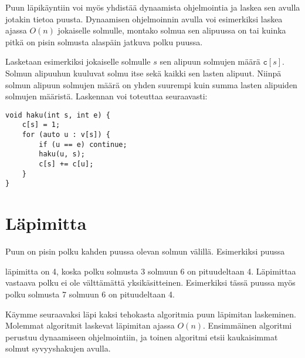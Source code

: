 Puun läpikäyntiin voi myös yhdistää dynaamista
ohjelmointia ja laskea sen avulla jotakin tietoa puusta.
Dynaamisen ohjelmoinnin avulla voi esimerkiksi
laskea ajassa $O(n)$ jokaiselle solmulle,
montako solmua sen alipuussa
on tai kuinka pitkä on pisin solmusta
alaspäin jatkuva polku puussa.

Lasketaan esimerkiksi jokaiselle solmulle $s$
sen alipuun solmujen määrä $\texttt{c}[s]$.
Solmun alipuuhun kuuluvat solmu itse
sekä kaikki sen lasten alipuut.
Niinpä solmun alipuun solmujen määrä on
yhden suurempi kuin summa lasten
alipuiden solmujen määristä.
Laskennan voi toteuttaa seuraavasti:

\begin{lstlisting}
void haku(int s, int e) {
    c[s] = 1;
    for (auto u : v[s]) {
        if (u == e) continue;
        haku(u, s);
        c[s] += c[u];
    }
}
\end{lstlisting}

\section{Läpimitta}


Puun  on pisin polku
kahden puussa olevan solmun välillä.
Esimerkiksi puussa
\begin{center}
\end{center}
läpimitta on 4, koska polku solmusta 3 solmuun 6
on pituudeltaan 4.
Läpimittaa vastaava polku ei ole
välttämättä yksikäsitteinen.
Esimerkiksi tässä puussa myös polku solmusta 7
solmuun 6 on pituudeltaan 4.

Käymme seuraavaksi läpi kaksi tehokasta
algoritmia puun läpimitan laskeminen.
Molemmat algoritmit laskevat läpimitan ajassa
$O(n)$.
Ensimmäinen algoritmi perustuu dynaamiseen
ohjelmointiin, ja toinen algoritmi
etsii kaukaisimmat solmut syvyyshakujen avulla.

